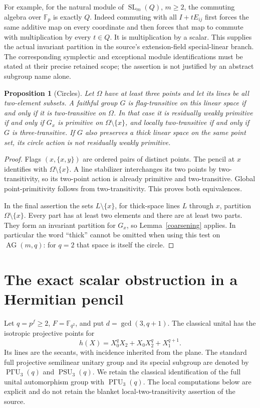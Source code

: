 \documentclass[11pt,a4paper]{article}
\newtheorem{proposition}[theorem]{Proposition}
\newcommand{\F}{\mathbb F}
\newcommand{\PSU}{\operatorname{PSU}}
\newcommand{\PGammaU}{\operatorname{P\Gamma U}}
\begin{document}
For example, for the natural module of $\operatorname{SL}_m(Q)$, $m\geq2$,
the commuting algebra over $\F_p$ is exactly $Q$. Indeed commuting with
all $I+tE_{ij}$ first forces the same additive map on every coordinate
and then forces that map to commute with multiplication by every $t\in Q$.
It is multiplication by a scalar. This supplies the actual invariant
partition in the source's extension-field special-linear branch. The
corresponding symplectic and exceptional module identifications must be
stated at their precise retained scope; the assertion is not justified by
an abstract subgroup name alone.

\begin{proposition}[Circles]\label{circles}
Let $\Omega$ have at least three points and let its lines be all two-element
subsets. A faithful group $G$ is flag-transitive on this linear space if
and only if it is two-transitive on $\Omega$. In that case it is residually
weakly primitive if and only if $G_x$ is primitive on $\Omega\setminus\{x\}$,
and locally two-transitive if and only if $G$ is three-transitive.
If $G$ also preserves a thick linear space on the same point set, its
circle action is not residually weakly primitive.
\end{proposition}
\begin{proof}
Flags $(x,\{x,y\})$ are ordered pairs of distinct points. The pencil at
$x$ identifies with $\Omega\setminus\{x\}$. A line stabilizer interchanges
its two points by two-transitivity, so its two-point action is already
primitive and two-transitive. Global point-primitivity follows from
two-transitivity. This proves both equivalences.

In the final assertion the sets $L\setminus\{x\}$, for thick-space lines
$L$ through $x$, partition $\Omega\setminus\{x\}$. Every part has at least
two elements and there are at least two parts. They form an invariant
partition for $G_x$, so Lemma~\ref{coarsening} applies. In particular the
word ``thick'' cannot be omitted when using this test on $\operatorname{AG}(m,q)$:
for $q=2$ that space is itself the circle.
\end{proof}







\section{The exact scalar obstruction in a Hermitian pencil}
Let $q=p^f\geq2$, $F=\F_{q^2}$, and put $d=\gcd(3,q+1)$.
The classical unital
has the isotropic projective points for
\[
 h(X)=X_0^qX_2+X_0X_2^q+X_1^{q+1}.
\]
Its lines are the secants, with incidence inherited from the plane.
The standard full projective semilinear unitary group and its special
subgroup are denoted by $\PGammaU_3(q)$ and $\PSU_3(q)$.
We retain the classical identification of the full unital automorphism
group with $\PGammaU_3(q)$. The local computations below are explicit and
do not retain the blanket local-two-transitivity assertion of the source.
\end{document}
